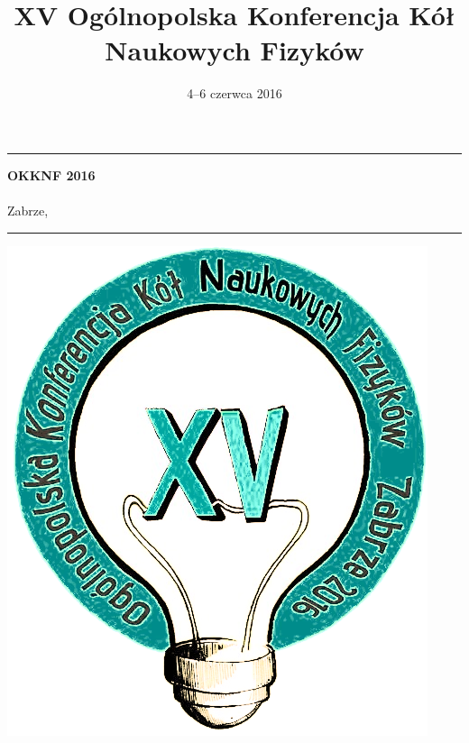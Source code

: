 \documentclass[13pt, a4paper, oneside, notitlepage]{article}
\title{XV Ogólnopolska Konferencja Kół Naukowych Fizyków}
\date{4--6 czerwca 2016}
\begin{document}
\pagestyle{fancy}
\fancyhf{}
\fancyhead[RO,LE]{\thepage}
\fancyhead[LO,RE]{\thetitle}

\begin{titlepage}

\thispagestyle{empty}

\topmargin 2cm
\noindent \rule{\textwidth}{3.0pt}
\begin{center}
	\Huge \textbf{OKKNF 2016} \\
	\vspace{0.5cm}
	\LARGE {\thetitle} \\
	Zabrze, \thedate
\end{center}
\noindent \rule{\textwidth}{3.0pt}

\vspace{1.5cm}

\begin{center}
\includegraphics[scale=0.5]{img/okknf-2016-logo.png}
\end{center}

\end{titlepage}
\newpage

\thispagestyle{empty}
\mbox{}
\newpage
\end{document}
